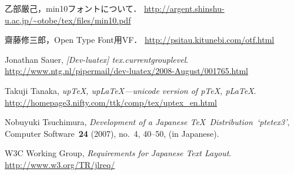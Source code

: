 \documentclass{ajt}
\begin{document}
\begin{thebibliography}{99}
乙部厳己，min10フォントについて．
\url{http://argent.shinshu-u.ac.jp/~otobe/tex/files/min10.pdf}

齋藤修三郎，Open Type Font用VF．
\url{http://psitau.kitunebi.com/otf.html}

Jonathan Sauer, \emph{[Dev-luatex] tex.currentgrouplevel}. 
\url{http://www.ntg.nl/pipermail/dev-luatex/2008-August/001765.html}

Takuji Tanaka, \emph{up\TeX, up\LaTeX---unicode version of p\TeX, p\LaTeX}.
\url{http://homepage3.nifty.com/ttk/comp/tex/uptex_en.html}

Nobuyuki Tsuchimura, \emph{Development of a Japanese \TeX\ Distribution~`ptetex3'},
Computer Software\ \textbf{24} (2007), no.~4, 40--50, (in Japanese).

W3C Working Group, \emph{Requirements for Japanese Text Layout}. 
\url{http://www.w3.org/TR/jlreq/}
\end{thebibliography}
\end{document}
